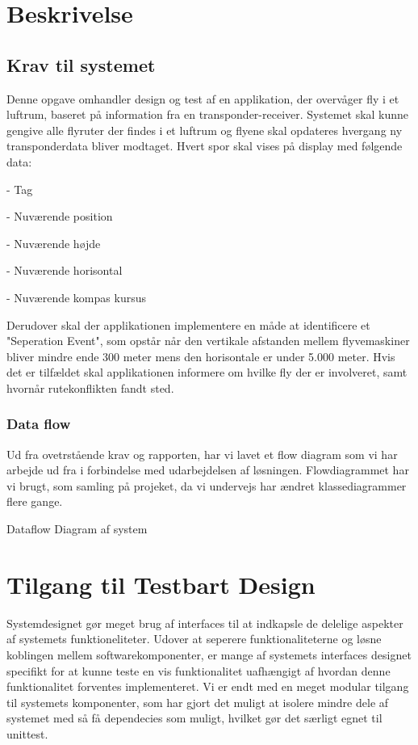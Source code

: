 \section{Beskrivelse}
\subsection{Krav til systemet}
Denne opgave omhandler design og test af en applikation, der overvåger fly i et luftrum, baseret på information fra en transponder-receiver. 
Systemet skal kunne gengive alle flyruter der findes i et luftrum og flyene skal opdateres hvergang ny transponderdata bliver modtaget. Hvert spor skal vises på display med følgende data: 

- Tag

- Nuværende position

- Nuværende højde

- Nuværende horisontal

- Nuværende kompas kursus

Derudover skal der applikationen implementere en måde at identificere et "Seperation Event", som opstår når den vertikale afstanden mellem flyvemaskiner bliver mindre ende 300 meter mens den horisontale er under 5.000 meter. 
Hvis det er tilfældet skal applikationen informere om hvilke fly der er involveret, samt hvornår rutekonflikten fandt sted.

\subsubsection{Data flow}
Ud fra ovetrstående krav og rapporten, har vi lavet et flow diagram som vi har arbejde ud fra i forbindelse med udarbejdelsen af løsningen. Flowdiagrammet har vi brugt, som samling på projeket, da vi undervejs har ændret klassediagrammer flere gange. 

{Dataflow Diagram af system}

\newpage
\section{Tilgang til Testbart Design}

Systemdesignet gør meget brug af interfaces til at indkapsle de delelige aspekter af systemets funktioneliteter. 
Udover at seperere funktionaliteterne og løsne koblingen mellem softwarekomponenter, er mange af systemets interfaces designet specifikt for at kunne teste en vis funktionalitet uafhængigt af hvordan denne funktionalitet forventes implementeret.
Vi er endt med en meget modular tilgang til systemets komponenter, som har gjort det muligt at isolere mindre dele af systemet med så få dependecies som muligt, hvilket gør det særligt egnet til unittest.


